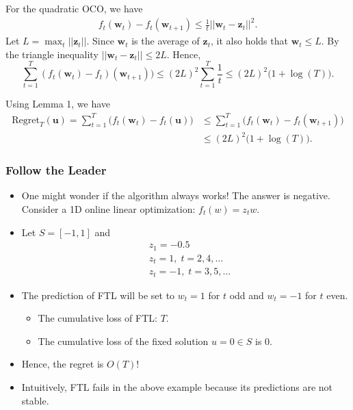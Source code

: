 \documentclass{beamer}
\newcommand{\uu}{\mathbf{u}}
\newcommand{\z}{\mathbf{z}}
\newcommand{\w}{\mathbf{w}}
\begin{document}
\begin{frame}
For the quadratic OCO, we have 
\begin{align*}
f_t(\w_t) - f_t(\w_{t+1}) \leq \frac{1}{t} ||\w_t-\z_t||^2.
\end{align*}
\pause
Let $L = \max_t ||\z_t||$. Since $\w_t$ is the average of $\z_t$, it also holds that $\w_t \leq L$. By the triangle inequality $||\w_t - \z_t|| \leq 2L$. Hence,
$$\sum_{t = 1}^{T} (f_t(\w_t) - f_t)(\w_{t+1})) \leq (2L)^2 \sum_{t=1}^{T}\frac{1}{t} \leq (2L)^2\big(1+\log(T)\big). $$

\pause
Using Lemma 1, we have
\begin{align*}\mathrm{Regret}_T(\uu) = \sum_{t = 1}^{T} \big(f_t(\w_t) - f_t(\uu)\big) &\leq \sum_{t = 1}^{T} \big(f_t(\w_t) - f_t(\w_{t+1})\big)\\
&\leq (2L)^2\big(1+\log(T)\big).
\end{align*}
\end{frame}

\begin{frame}
\frametitle{Follow the Leader}
\begin{itemize}
\item One might wonder if the algorithm always works! \pause  The answer is negative. Consider a 1D online linear optimization: $f_t(w) = z_t w$.
\pause
\item Let $S = [-1, 1]$ and 
\begin{align*}
&z_1 = -0.5\\
&z_t = 1, \; t = 2, 4, \dots\\
&z_t = -1, \; t = 3, 5, \dots
\end{align*}
\item The prediction of FTL will be set to $w_t = 1$ for $t$ odd and $w_t = -1$ for $t$ even. 

\pause
\begin{itemize}
\item The cumulative loss of FTL: $T$.
\item The cumulative loss of the fixed solution $u = 0 \in S$ is $0$.
\end{itemize}
\pause
\item Hence, the regret is $O(T)$!
\pause
\item Intuitively, FTL fails in the above example because its predictions are not stable.

\end{itemize}
\end{frame}
\end{document}
